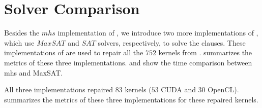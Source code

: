 \section{Solver Comparison}

Besides the $mhs$ implementation of \tool, we introduce two more implementations of \tool, which use $MaxSAT$ and $SAT$ solvers, respectively, to solve the clauses. These implementations of \tool are used to repair all the $752$ kernels from .  summarizes the metrics of these three implementations.  and  show the time comparison between mhs and MaxSAT.




All three implementations repaired $83$ kernels ($53$ CUDA and $30$ OpenCL).  summarizes the metrics of these three implementations for these repaired kernels.


